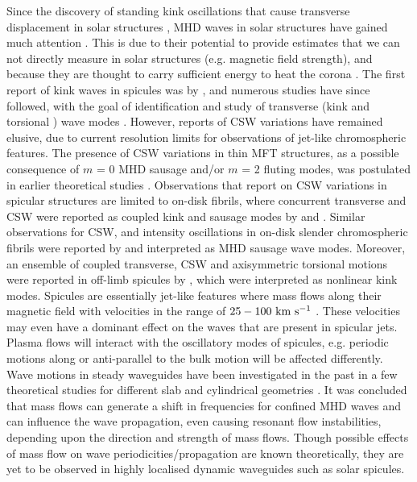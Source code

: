 Since the discovery of standing kink oscillations that cause transverse displacement in solar structures \citep{Aschwanden1999ApJ520880A, Nakariakov1999Sci285862N, Aschwanden2002SoPh20699A}, MHD waves in solar structures have gained much attention \citep{Cally1985AuJPh38825C, Kudoh1999ApJ514493K, Fujimura2009ApJ7021443F, Zaqarashvili_2009SSRv, Kuridze2012, Jess2012ApJ744L5J, Mooroogen2017AA607A46M, Allcock2019FrASS648A}. This is due to their potential to provide estimates that we can not directly measure in solar structures (e.g. magnetic field strength), and because they are thought to carry sufficient energy to heat the corona \citep{Alfv1947MNRAS107211A, Gordon1983ApJ266373G, Poedts2002ESASP505273P, Srivastava2017NatSR743147S}. The first report of kink waves in spicules was by \cite{Kukhianidze2006AA}, and numerous studies have since followed, with the goal of identification and study of transverse (kink and torsional \Alfven) wave modes \citep{De_Pontieu2007, Ebadi2014ApSS35331E, Pascoe2016AA585L6P, Sharma2017, Tiwari2019ApJ876106T}. However, reports of CSW variations have remained elusive, due to current resolution limits for observations of jet-like chromospheric features. The presence of CSW variations in thin MFT structures, as a possible consequence of $m$ = 0 MHD sausage and/or $m$ = 2 fluting modes, was postulated in earlier theoretical studies \citep{Ziegler1997a, Ziegler1997, Ruderman2010}. Observations that report on CSW variations in spicular structures are limited to on-disk fibrils, where concurrent transverse and CSW were reported as coupled kink and sausage modes by \cite{Jess2012ApJ744L5J} and \cite{Morton2012}. Similar observations for CSW, and intensity oscillations in on-disk slender chromospheric fibrils were reported by \citet{Gafeira2017ApJS2297G} and interpreted as MHD sausage wave modes. Moreover, an ensemble of coupled transverse, CSW and axisymmetric torsional motions were reported in off-limb spicules by \citet{Sharma2018ApJ85361S}, which were interpreted as nonlinear kink modes. \np
Spicules are essentially jet-like features where mass flows along their magnetic field with velocities in the range of $25-100~\rm{km ~s^{-1}}$  \citep{Beckers1972ARA&A, Sterling_2000SoPh, Pereira2012}. These velocities may even have a dominant effect on the waves that are present in spicular jets. Plasma flows will interact with the oscillatory modes of spicules, e.g. periodic motions along or anti-parallel to the bulk motion will be affected differently. Wave motions in steady waveguides have been investigated in the past in a few theoretical studies for different slab and cylindrical geometries \citep{Narayanan1991,nakariakov1995, terrahomem2003, soler2008}. It was concluded that mass flows can generate a shift in frequencies for confined MHD waves and can influence the wave propagation, even causing resonant flow instabilities, depending upon the direction and strength of mass flows. Though possible effects of mass flow on wave periodicities/propagation are known theoretically, they are yet to be observed in highly localised dynamic waveguides such as solar spicules. \np
